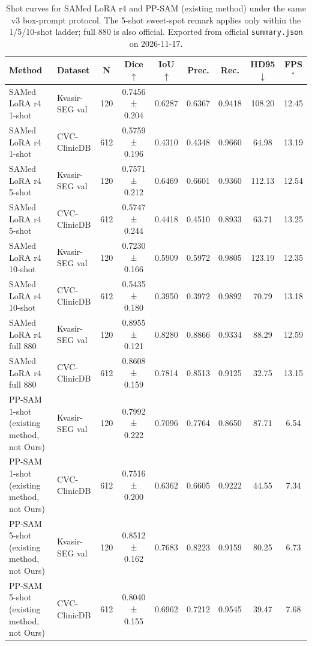 \begin{table}[ht]
\centering
\caption{Shot curves for SAMed LoRA r4 and PP-SAM (existing method) under the same v3 box-prompt protocol. The 5-shot sweet-spot remark applies only within the 1/5/10-shot ladder; full 880 is also official. Exported from official \texttt{summary.json} on 2026-11-17.}
\label{tab:shot-curves}
\begin{tabular}{llccccccc}
\toprule
Method & Dataset & N & Dice $\uparrow$ & IoU $\uparrow$ & Prec. & Rec. & HD95 $\downarrow$ & FPS$^*$ \\
\midrule
SAMed LoRA r4 1-shot & Kvasir-SEG val & 120 & 0.7456 ± 0.204 & 0.6287 & 0.6367 & 0.9418 & 108.20 & 12.45 \\
SAMed LoRA r4 1-shot & CVC-ClinicDB & 612 & 0.5759 ± 0.196 & 0.4310 & 0.4348 & 0.9660 & 64.98 & 13.19 \\
SAMed LoRA r4 5-shot & Kvasir-SEG val & 120 & 0.7571 ± 0.212 & 0.6469 & 0.6601 & 0.9360 & 112.13 & 12.54 \\
SAMed LoRA r4 5-shot & CVC-ClinicDB & 612 & 0.5747 ± 0.244 & 0.4418 & 0.4510 & 0.8933 & 63.71 & 13.25 \\
SAMed LoRA r4 10-shot & Kvasir-SEG val & 120 & 0.7230 ± 0.166 & 0.5909 & 0.5972 & 0.9805 & 123.19 & 12.35 \\
SAMed LoRA r4 10-shot & CVC-ClinicDB & 612 & 0.5435 ± 0.180 & 0.3950 & 0.3972 & 0.9892 & 70.79 & 13.18 \\
SAMed LoRA r4 full 880 & Kvasir-SEG val & 120 & 0.8955 ± 0.121 & 0.8280 & 0.8866 & 0.9334 & 88.29 & 12.59 \\
SAMed LoRA r4 full 880 & CVC-ClinicDB & 612 & 0.8608 ± 0.159 & 0.7814 & 0.8513 & 0.9125 & 32.75 & 13.15 \\
PP-SAM 1-shot (existing method, not Ours) & Kvasir-SEG val & 120 & 0.7992 ± 0.222 & 0.7096 & 0.7764 & 0.8650 & 87.71 & 6.54 \\
PP-SAM 1-shot (existing method, not Ours) & CVC-ClinicDB & 612 & 0.7516 ± 0.200 & 0.6362 & 0.6605 & 0.9222 & 44.55 & 7.34 \\
PP-SAM 5-shot (existing method, not Ours) & Kvasir-SEG val & 120 & 0.8512 ± 0.162 & 0.7683 & 0.8223 & 0.9159 & 80.25 & 6.73 \\
PP-SAM 5-shot (existing method, not Ours) & CVC-ClinicDB & 612 & 0.8040 ± 0.155 & 0.6962 & 0.7212 & 0.9545 & 39.47 & 7.68 \\

\end{tabular}
\end{table}
